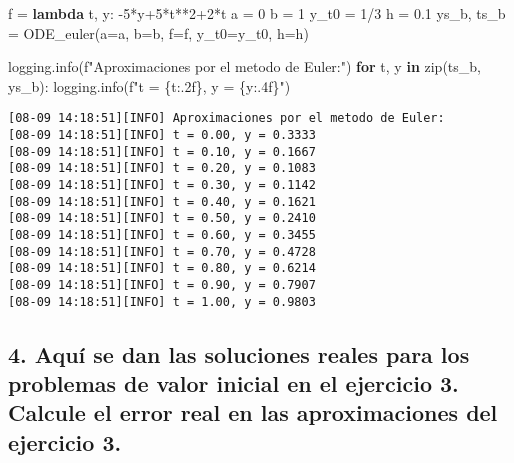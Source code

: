 \documentclass[
  letterpaper,
  DIV=11,
  numbers=noendperiod]{scrartcl}
\newenvironment{Shaded}{\begin{snugshade}}{\end{snugshade}}
\newcommand{\BuiltInTok}[1]{\textcolor[rgb]{0.00,0.23,0.31}{#1}}
\newcommand{\ControlFlowTok}[1]{\textcolor[rgb]{0.00,0.23,0.31}{\textbf{#1}}}
\newcommand{\DecValTok}[1]{\textcolor[rgb]{0.68,0.00,0.00}{#1}}
\newcommand{\FloatTok}[1]{\textcolor[rgb]{0.68,0.00,0.00}{#1}}
\newcommand{\KeywordTok}[1]{\textcolor[rgb]{0.00,0.23,0.31}{\textbf{#1}}}
\newcommand{\NormalTok}[1]{\textcolor[rgb]{0.00,0.23,0.31}{#1}}
\newcommand{\OperatorTok}[1]{\textcolor[rgb]{0.37,0.37,0.37}{#1}}
\newcommand{\SpecialCharTok}[1]{\textcolor[rgb]{0.37,0.37,0.37}{#1}}
\newcommand{\SpecialStringTok}[1]{\textcolor[rgb]{0.13,0.47,0.30}{#1}}
\begin{document}
\begin{Shaded}
\begin{Highlighting}[]
\NormalTok{f }\OperatorTok{=} \KeywordTok{lambda}\NormalTok{ t, y: }\OperatorTok{{-}}\DecValTok{5}\OperatorTok{*}\NormalTok{y}\OperatorTok{+}\DecValTok{5}\OperatorTok{*}\NormalTok{t}\OperatorTok{**}\DecValTok{2}\OperatorTok{+}\DecValTok{2}\OperatorTok{*}\NormalTok{t}
\NormalTok{a }\OperatorTok{=} \DecValTok{0} 
\NormalTok{b }\OperatorTok{=} \DecValTok{1}  
\NormalTok{y\_t0 }\OperatorTok{=} \DecValTok{1}\OperatorTok{/}\DecValTok{3} 
\NormalTok{h }\OperatorTok{=} \FloatTok{0.1} 
\NormalTok{ys\_b, ts\_b }\OperatorTok{=}\NormalTok{ ODE\_euler(a}\OperatorTok{=}\NormalTok{a, b}\OperatorTok{=}\NormalTok{b, f}\OperatorTok{=}\NormalTok{f, y\_t0}\OperatorTok{=}\NormalTok{y\_t0, h}\OperatorTok{=}\NormalTok{h)}

\NormalTok{logging.info(}\SpecialStringTok{f"Aproximaciones por el metodo de Euler:"}\NormalTok{)}
\ControlFlowTok{for}\NormalTok{ t, y }\KeywordTok{in} \BuiltInTok{zip}\NormalTok{(ts\_b, ys\_b):}
\NormalTok{    logging.info(}\SpecialStringTok{f"t = }\SpecialCharTok{\{}\NormalTok{t}\SpecialCharTok{:.2f\}}\SpecialStringTok{, y = }\SpecialCharTok{\{}\NormalTok{y}\SpecialCharTok{:.4f\}}\SpecialStringTok{"}\NormalTok{)}
\end{Highlighting}
\end{Shaded}

\begin{verbatim}
[08-09 14:18:51][INFO] Aproximaciones por el metodo de Euler:
[08-09 14:18:51][INFO] t = 0.00, y = 0.3333
[08-09 14:18:51][INFO] t = 0.10, y = 0.1667
[08-09 14:18:51][INFO] t = 0.20, y = 0.1083
[08-09 14:18:51][INFO] t = 0.30, y = 0.1142
[08-09 14:18:51][INFO] t = 0.40, y = 0.1621
[08-09 14:18:51][INFO] t = 0.50, y = 0.2410
[08-09 14:18:51][INFO] t = 0.60, y = 0.3455
[08-09 14:18:51][INFO] t = 0.70, y = 0.4728
[08-09 14:18:51][INFO] t = 0.80, y = 0.6214
[08-09 14:18:51][INFO] t = 0.90, y = 0.7907
[08-09 14:18:51][INFO] t = 1.00, y = 0.9803
\end{verbatim}

\subsection{4. Aquí se dan las soluciones reales para los problemas de
valor inicial en el ejercicio 3. Calcule el error real en las
aproximaciones del ejercicio
3.}\label{aquuxed-se-dan-las-soluciones-reales-para-los-problemas-de-valor-inicial-en-el-ejercicio-3.-calcule-el-error-real-en-las-aproximaciones-del-ejercicio-3.}
\end{document}
